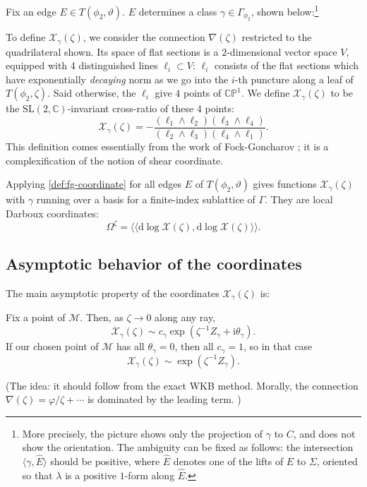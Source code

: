 \documentclass[12pt,letterpaper,reqno]{article}
\numberwithin{equation}{section}
\newcommand{\cM}{\ensuremath{\mathcal M}}
\newcommand{\cX}{\ensuremath{\mathcal X}}
\newcommand{\bbC}{\ensuremath{\mathbb C}}
\newcommand{\bbP}{\ensuremath{\mathbb P}}
\newcommand{\I}{{\mathrm i}}
\newcommand{\de}{\mathrm{d}}
\newcommand{\IP}[1]{\langle#1\rangle}
\newcommand{\DIP}[1]{\langle\!\langle#1\rangle\!\rangle}
\newcommand{\ti}[1]{\textit{#1}}
\newcommand{\SL}{\mathrm{SL}}
\newcommand{\insfig}[2]{

\medskip
\noindent
\begin{minipage}{\linewidth}

\makebox[\linewidth]{\texttt{[image: figures/\#1-crop.pdf]}}

\end{minipage}
\medskip

}
\newcommand{\fixme}[1]{{\color{orange}{[#1]}}}
\begin{document}
\begin{defn} \label{def:fg-coordinate}
Fix an edge $E \in T(\phi_2,\vartheta)$.
$E$ determines a class $\gamma \in \Gamma_{\phi_2}$, shown
below:\footnote{More precisely, the picture shows
only the projection of $\gamma$ to $C$, and does not show
the orientation. The ambiguity can be fixed as follows:
the intersection $\IP{\gamma,\hat E}$ should be positive,
where $\hat E$ denotes one of the lifts of $E$ to $\Sigma$,
oriented so that $\lambda$ is a positive $1$-form
along $\hat E$.}
\insfig{higgs-metric-10}{1.3}
To define $\cX_\gamma(\zeta)$, we consider the connection
$\nabla(\zeta)$ restricted to the quadrilateral shown.
Its space of flat sections is a $2$-dimensional vector space $V$,
equipped with $4$ distinguished lines $\ell_i \subset V$:
$\ell_i$ consists of the flat sections
which have exponentially \ti{decaying} norm 
as we go into the $i$-th 
puncture along a leaf of $T(\phi_2,\zeta)$.
Said otherwise, the $\ell_i$ give $4$ points of $\bbC\bbP^1$.
We define $\cX_\gamma(\zeta)$ to be the
$\SL(2,\bbC)$-invariant cross-ratio of these $4$ points:
\begin{equation}
	\cX_\gamma(\zeta) = - \frac{(\ell_1 \wedge \ell_2)(\ell_3 \wedge \ell_4)}{(\ell_2 \wedge \ell_3) (\ell_4 \wedge \ell_1)} .
\end{equation}
This definition comes essentially from
the work of Fock-Goncharov \cite{MR2233852}; it is a complexification of the notion of shear coordinate.
\end{defn}

Applying \autoref{def:fg-coordinate} for all edges $E$
of $T(\phi_2,\vartheta)$ gives functions
$\cX_\gamma(\zeta)$ with $\gamma$ running over a basis for
a finite-index sublattice of $\Gamma$. They are local
Darboux coordinates:
\begin{equation}
  \Omega^\zeta = \DIP{\de \log \cX(\zeta), \de \log \cX(\zeta)}.
\end{equation}

\subsection{Asymptotic behavior of the coordinates}

The main asymptotic property of the coordinates $\cX_\gamma(\zeta)$ is:
\begin{conj}
Fix a point of $\cM$.
Then, as $\zeta \to 0$ along any ray,
\begin{equation}
  \cX_\gamma(\zeta) \sim c_\gamma \exp \left(\zeta^{-1} Z_\gamma + \I \theta_\gamma \right).
\end{equation}
If our chosen point of $\cM$ has all 
$\theta_\gamma = 0$, then all $c_\gamma = 1$, so in that case
\begin{equation}
  \cX_\gamma(\zeta) \sim \exp \left(\zeta^{-1} Z_\gamma\right).
\end{equation}
\end{conj}
(The idea: it should follow from the exact WKB method. Morally,
the connection $\nabla(\zeta) = \varphi / \zeta + \cdots$ 
is dominated by the leading term. \fixme{explain a little more?})
\end{document}
